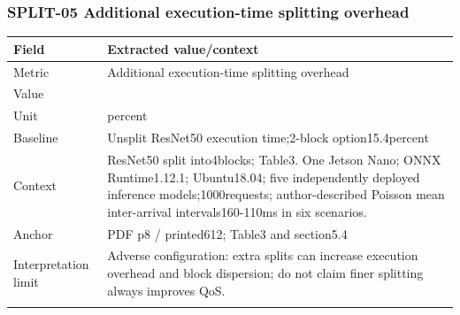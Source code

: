 \subsubsection*{SPLIT-05 Additional execution-time splitting overhead}
\begin{longtable}{>{\raggedright\arraybackslash}p{}>{\raggedright\arraybackslash}p{}}
\toprule
\textbf{Field} & \textbf{Extracted value/context}\\\midrule\endhead
Metric & Additional execution-time splitting overhead\\\addlinespace
Value & 50.3\\\addlinespace
Unit & percent\\\addlinespace
Baseline & Unsplit ResNet50 execution time;\allowbreak{}2-block option15.4percent\\\addlinespace
Context & ResNet50 split into4blocks;\allowbreak{} Table3. One Jetson Nano;\allowbreak{} ONNX Runtime1.12.1;\allowbreak{} Ubuntu18.04;\allowbreak{} five independently deployed inference models;\allowbreak{}1000requests;\allowbreak{} author-described Poisson mean inter-arrival intervals160-110ms in six scenarios.\\\addlinespace
Anchor & PDF p8 / printed612;\allowbreak{} Table3 and section5.4\\\addlinespace
Interpretation limit & Adverse configuration: extra splits can increase execution overhead and block dispersion;\allowbreak{} do not claim finer splitting always improves QoS.\\\addlinespace
\bottomrule\end{longtable}
